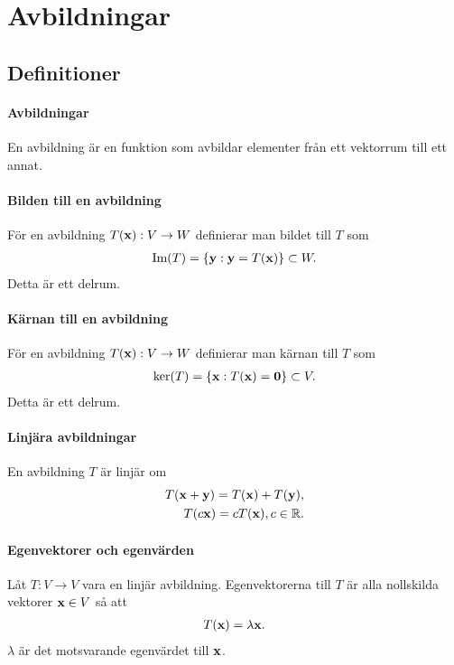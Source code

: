 \section{Avbildningar}

\subsection{Definitioner}

\paragraph{Avbildningar}
En avbildning är en funktion som avbildar elementer från ett vektorrum till ett annat.

\paragraph{Bilden till en avbildning}
För en avbildning $T(\vect{x}): V\to W$ definierar man bildet till $T$ som
\begin{align*}
	\Im{T} = \{\vect{y} : \vect{y} = T(\vect{x})\}\subset W.
\end{align*}
Detta är ett delrum.

\paragraph{Kärnan till en avbildning}
För en avbildning $T(\vect{x}): V\to W$ definierar man kärnan till $T$ som
\begin{align*}
	\ker{T} = \{\vect{x} : T(\vect{x})= \vect{0}\}\subset V.
\end{align*}
Detta är ett delrum.

\paragraph{Linjära avbildningar}
En avbildning $T$ är linjär om
\begin{align*}
	T(\vect{x} + \vect{y}) = T(\vect{x}) + T(\vect{y}), \\
	T(c\vect{x}) = cT(\vect{x}), c\in\R.
\end{align*}

\paragraph{Egenvektorer och egenvärden}\label{par:eigen_values}
Låt $T: V\to V$ vara en linjär avbildning. Egenvektorerna till $T$ är alla nollskilda vektorer $\vect{x}\in V$ så att
\begin{align*}
	T(\vect{x}) = \lambda\vect{x}.
\end{align*}
$\lambda$ är det motsvarande egenvärdet till $\vect{x}$.

